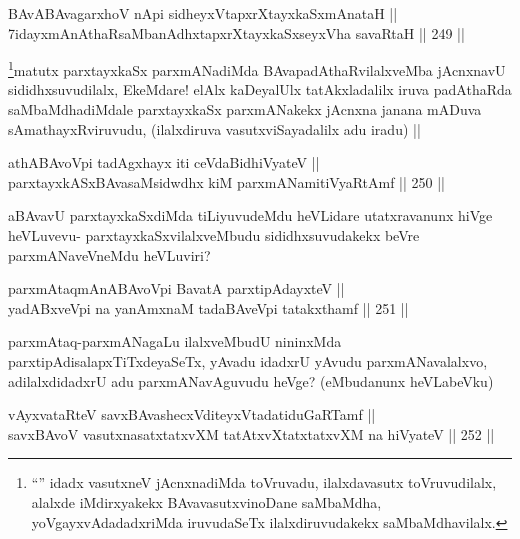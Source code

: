 
\begin{shl}
BAvABAvagarxhoV nApi sidheyxVtapxrXtayxkaSxmAnataH || \\
7idayxmAnAthaRsaMbanAdhxtapxrXtayxkaSxseyxVha savaRtaH ||  249 ||  
\end{shl}

\begin{artha}
\footnote{``\stext'' idadx vasutxneV jAcnxnadiMda toVruvadu, ilalxdavasutx toVruvudilalx, alalxde iMdirxyakekx BAvavasutxvinoDane saMbaMdha, yoVgayxvAdadadxriMda iruvudaSeTx ilalxdiruvudakekx saMbaMdhavilalx.}matutx parxtayxkaSx parxmANadiMda BAvapadAthaRvilalxveMba jAcnxnavU sididhxsuvudilalx, EkeMdare! elAlx kaDeyalUlx tatAkxladalilx iruva padAthaRda saMbaMdhadiMdale parxtayxkaSx parxmANakekx jAcnxna janana mADuva sAmathayxRviruvudu, (ilalxdiruva vasutxviSayadalilx adu iradu) || 
\end{artha}


\begin{shl}
athABAvoV\s pi tadAgxhayx iti ceVdaBidhiVyateV || \\
parxtayxkASxBAvasaMsidwdhx kiM parxmANamitiVyaRtAmf ||  250 ||  
\end{shl}

\begin{artha}
aBAvavU parxtayxkaSxdiMda tiLiyuvudeMdu heVLidare utatxravanunx hiVge heVLuvevu- parxtayxkaSxvilalxveMbudu sididhxsuvudakekx beVre parxmANaveVneMdu heVLuviri?
\end{artha}

\begin{shl}
parxmAtaqmAnABAvoV\s pi BavatA parxtipAdayxteV || \\
yadABxveV\s pi na yanAmxnaM tadaBAveV\s pi tatakxthamf ||  251 ||  
\end{shl}

\begin{artha}
parxmAtaq-parxmANagaLu ilalxveMbudU nininxMda parxtipAdisalapxTiTxdeyaSeTx, yAvadu idadxrU yAvudu parxmANavalalxvo, adilalxdidadxrU adu parxmANavAguvudu heVge? (eMbudanunx heVLabeVku)
\end{artha}


\begin{shl}
vAyxvataRteV savxBAvashecxVditeyxVtadatiduGaRTamf || \\
savxBAvoV vasutxnasatxtatxvXM tatAtxvXtatxtatxvXM na hiVyateV ||  252 ||  
\end{shl}

